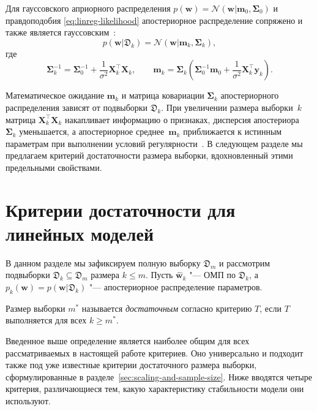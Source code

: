 Для гауссовского априорного распределения $p(\mathbf{w}) = \mathcal{N}(\mathbf{w} | \mathbf{m}_0, \boldsymbol{\Sigma}_0)$ и правдоподобия \eqref{eq:linreg-likelihood} апостериорное распределение сопряжено и также является гауссовским~\cite{bishop2006pattern}:
\begin{equation}
    \label{eq:posterior-gaussian}
    p(\mathbf{w} | \mathfrak{D}_k) = \mathcal{N}(\mathbf{w} | \mathbf{m}_k, \boldsymbol{\Sigma}_k),
\end{equation}
где
\begin{equation}
    \boldsymbol{\Sigma}_k^{-1} = \boldsymbol{\Sigma}_0^{-1} + \frac{1}{\sigma^2} \mathbf{X}_k^\top \mathbf{X}_k, \qquad \mathbf{m}_k = \boldsymbol{\Sigma}_k \left( \boldsymbol{\Sigma}_0^{-1} \mathbf{m}_0 + \frac{1}{\sigma^2} \mathbf{X}_k^\top \mathbf{y}_k \right).
\end{equation}

Математическое ожидание $\mathbf{m}_k$ и матрица ковариации $\boldsymbol{\Sigma}_k$ апостериорного распределения зависят от подвыборки $\mathfrak{D}_k$. При увеличении размера выборки~$k$ матрица $\mathbf{X}_k^\top \mathbf{X}_k$ накапливает информацию о признаках, дисперсия апостериора~$\boldsymbol{\Sigma}_k$ уменьшается, а апостериорное среднее~$\mathbf{m}_k$ приближается к истинным параметрам при выполнении условий регулярности~. В следующем разделе мы предлагаем критерий достаточности размера выборки, вдохновленный этими предельными свойствами. 

\section{Критерии достаточности для линейных моделей}

В данном разделе мы зафиксируем полную выборку $\mathfrak{D}_m$ и рассмотрим подвыборки $\mathfrak{D}_k \subseteq \mathfrak{D}_m$ размера $k \leqslant m$. Пусть $\hat{\mathbf{w}}_k$ "--- ОМП по $\mathfrak{D}_k$, а $p_k(\mathbf{w}) = p(\mathbf{w} | \mathfrak{D}_k)$ "--- апостериорное распределение параметров.

\begin{definition}
    Размер выборки $m^*$ называется \emph{достаточным} согласно критерию $T$, если $T$ выполняется для всех $k \geqslant m^*$.
\end{definition}

Введенное выше определение является наиболее общим для всех рассматриваемых в настоящей работе критериев. Оно универсально и подходит также под уже известные критерии достаточного размера выборки, сформулированные в разделе~\ref{sec:scaling-and-sample-size}. Ниже вводятся четыре критерия, различающиеся тем, какую характеристику стабильности модели они используют.

